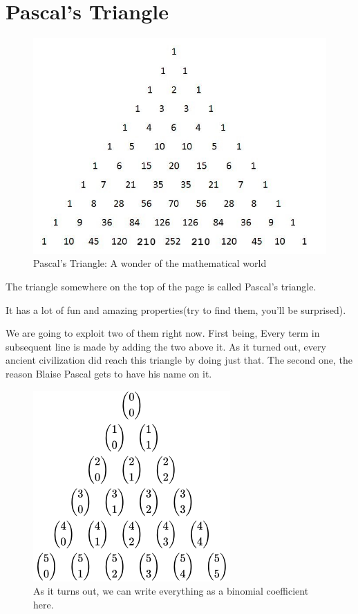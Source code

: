 \section{Pascal's Triangle}
\begin{figure}
    \centering
    \includegraphics[width=0.75\linewidth]{Photos/Pascal's Triangle.png}
    \caption{Pascal's Triangle: A wonder of the mathematical world}    
\end{figure}
The triangle somewhere on the top of the page is called Pascal's triangle. \par
It has a lot of fun and amazing properties(try to find them, you'll be surprised).\par
We are going to exploit two of them right now. First being, Every term in 
subsequent line is made by adding the two above it. As it turned out, every ancient 
civilization did reach this triangle by doing just that. The second one, the reason 
Blaise Pascal gets to have his name on it.
\begin{figure}
    \centering
    \includegraphics[width=0.75\linewidth]{Photos/Binomial Pascal}
    \caption{As it turns out, we can write everything as a binomial coefficient here.}
\end{figure}
